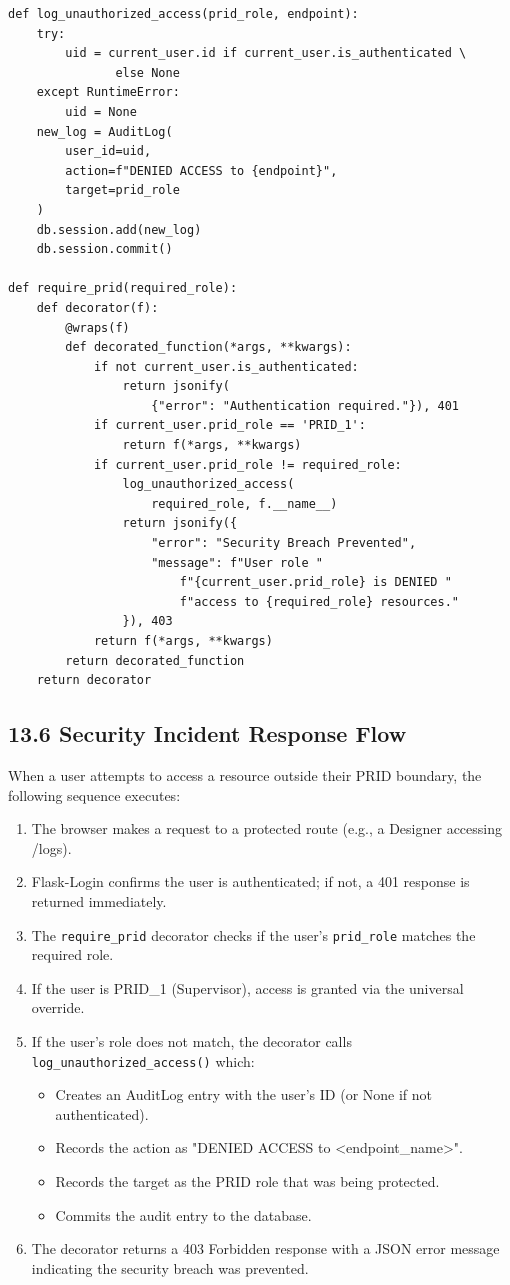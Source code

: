﻿\documentclass[12pt]{article}
\begin{document}
\begin{lstlisting}[style=pycode]
def log_unauthorized_access(prid_role, endpoint):
    try:
        uid = current_user.id if current_user.is_authenticated \
               else None
    except RuntimeError:
        uid = None
    new_log = AuditLog(
        user_id=uid,
        action=f"DENIED ACCESS to {endpoint}",
        target=prid_role
    )
    db.session.add(new_log)
    db.session.commit()

def require_prid(required_role):
    def decorator(f):
        @wraps(f)
        def decorated_function(*args, **kwargs):
            if not current_user.is_authenticated:
                return jsonify(
                    {"error": "Authentication required."}), 401
            if current_user.prid_role == 'PRID_1':
                return f(*args, **kwargs)
            if current_user.prid_role != required_role:
                log_unauthorized_access(
                    required_role, f.__name__)
                return jsonify({
                    "error": "Security Breach Prevented",
                    "message": f"User role "
                        f"{current_user.prid_role} is DENIED "
                        f"access to {required_role} resources."
                }), 403
            return f(*args, **kwargs)
        return decorated_function
    return decorator
\end{lstlisting}

\subsection*{13.6 Security Incident Response Flow}
When a user attempts to access a resource outside their PRID boundary, the following sequence executes:
\begin{enumerate}
\item The browser makes a request to a protected route (e.g., a Designer accessing /logs).
\item Flask-Login confirms the user is authenticated; if not, a 401 response is returned immediately.
\item The \texttt{require\_prid} decorator checks if the user's \texttt{prid\_role} matches the required role.
\item If the user is PRID\_1 (Supervisor), access is granted via the universal override.
\item If the user's role does not match, the decorator calls \texttt{log\_unauthorized\_access()} which:
   \begin{itemize}
   \item Creates an AuditLog entry with the user's ID (or None if not authenticated).
   \item Records the action as "DENIED ACCESS to <endpoint\_name>".
   \item Records the target as the PRID role that was being protected.
   \item Commits the audit entry to the database.
   \end{itemize}
\item The decorator returns a 403 Forbidden response with a JSON error message indicating the security breach was prevented.
\end{enumerate}
\end{document}
